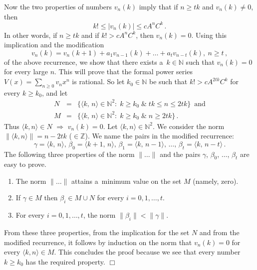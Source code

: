 \documentclass[10pt]{article}
\def\N{\mathbb{N}}
\def\Z{\mathbb{Z}}
\def\eproof{\hfill{$\Box$}\bigskip}
\def\ds{\dots}
\def\be{\beta}
\def\ga{\gamma}
\def\cc{\colon}
\begin{document}
Now the two properties of numbers $v_n(k)$ imply that if $n\ge tk$ and 
$v_n(k)\ne0$, then
$$
k!\le|v_n(k)|\le cA^nC^k\,.
$$
In other words, if $n\ge tk$ and if
$k!>cA^nC^k$, then $v_n(k)=0$. Using this implication and the modification
$$
v_n(k)=v_n(k+1)+a_1v_{n-1}(k)+\ds+a_tv_{n-t}(k),\ n\ge t\,,
$$
of the above recurrence, we show that there exists a~$k\in\N$ such that 
$v_n(k)=0$ for every large $n$.
This will prove that the formal power series $V(x)=\sum_{n\ge0}v_nx^n$ is 
rational. So let $k_0\in\N$ be such that $k!>cA^{2tk}C^k$ for every $k\ge k_0$, and let
\begin{eqnarray*}
N&=&\{\langle k,\,n\rangle\in\N^2\cc\;
k\ge k_0\;\&\;tk\le n\le 2tk\}\,\text{ and}\\
M&=&\{\langle k,\,n\rangle\in\N^2\cc\;k\ge k_0\;\&\;n\ge 2tk\}\,.    
\end{eqnarray*}
Thus $\langle k,n\rangle\in N$ $\Rightarrow$ $v_n(k)=0$. Let $\langle k,n\rangle\in\N^2$. We consider the norm
$\|\langle k,n\rangle\|=n-2tk$ ($\in\Z$). We name the pairs in the modified recurrence:
$$
\ga=\langle k,\,n\rangle,\,
\be_0=\langle k+1,\,n\rangle,\,
\be_1=\langle k,\,n-1\rangle,\,\ds,\,
\be_t=\langle k,\,n-t\rangle\,.
$$
The following three properties of the norm $\|\ds\|$ and 
the pairs $\ga$, $\be_0$, $\ds$, $\be_t$ are easy to prove.
\begin{enumerate}
\item The norm $\|\ds\|$ attains a~minimum value on the set $M$ (namely, zero). 
\item If $\ga\in M$ then $\be_i\in M\cup N$ for every $i=0,1,\ds,t$.
\item For every $i=0,1,\ds,t$, the norm $\|\be_i\|<\|\ga\|$. 
\end{enumerate}
From these three properties, from the implication for the set $N$ and from the modified recurrence, it follows by 
induction on the norm that $v_n(k)=0$ for every $\langle k,n\rangle\in M$. 
This concludes the proof because we see that every number $k\ge k_0$ has the 
required property.
\eproof
\end{document}
